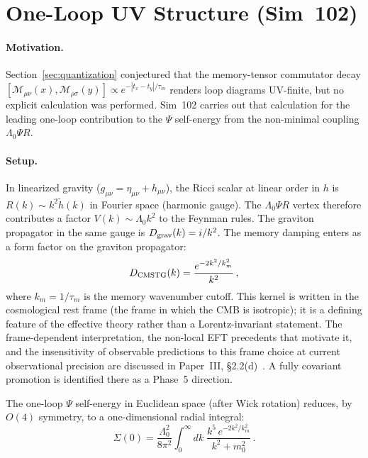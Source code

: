\documentclass[12pt,a4paper]{article}
\begin{document}
\section{One-Loop UV Structure (Sim~102)}
\label{sec:sim102}

\paragraph{Motivation.}
Section~\ref{sec:quantization} conjectured that the memory-tensor commutator
decay $[\mathcal{M}_{\mu\nu}(x), \mathcal{M}_{\rho\sigma}(y)] \propto
e^{-|t_x-t_y|/\tau_m}$ renders loop diagrams UV-finite, but no explicit
calculation was performed. Sim~102 carries out that calculation for the
leading one-loop contribution to the $\Psi$ self-energy from the
non-minimal coupling $\Lambda_0\Psi R$.

\paragraph{Setup.}
In linearized gravity ($g_{\mu\nu} = \eta_{\mu\nu} + h_{\mu\nu}$), the
Ricci scalar at linear order in $h$ is $R(k) \sim k^2 \tilde{h}(k)$ in
Fourier space (harmonic gauge). The $\Lambda_0\Psi R$ vertex therefore
contributes a factor $V(k) \sim \Lambda_0 k^2$ to the Feynman rules.
The graviton propagator in the same gauge is $D_{\rm grav}(k) = i/k^2$.
The memory damping enters as a form factor on the graviton propagator:
\begin{equation}
D_{\rm CMSTG}(k) = \frac{e^{-2k^2/k_m^2}}{k^2}\,,
\label{eq:CMSTG_graviton_prop}
\end{equation}
where $k_m = 1/\tau_m$ is the memory wavenumber cutoff.
This kernel is written in the cosmological rest frame (the frame in which the
CMB is isotropic); it is a defining feature of the effective theory rather than
a Lorentz-invariant statement. The frame-dependent interpretation, the
non-local EFT precedents that motivate it, and the insensitivity of observable
predictions to this frame choice at current observational precision are
discussed in Paper~III, \S2.2(d)~\cite{WilsonPaperIII}. A fully covariant
promotion is identified there as a Phase~5 direction.

The one-loop $\Psi$ self-energy in Euclidean space (after Wick rotation)
reduces, by $O(4)$ symmetry, to a one-dimensional radial integral:
\begin{equation}
\Sigma(0) = \frac{\Lambda_0^2}{8\pi^2}
\int_0^\infty dk\;\frac{k^5\,e^{-2k^2/k_m^2}}{k^2 + m_0^2}\,.
\label{eq:Sigma_integral}
\end{equation}
\end{document}
